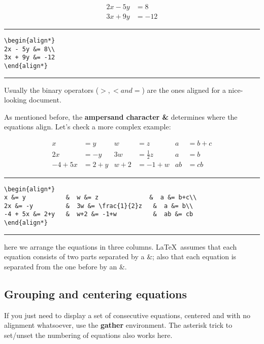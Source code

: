 \begin{align*}
2x - 5y &= 8\\
3x + 9y &= -12
\end{align*}

\noindent\vspace{1em}\hrule
\begin{verbatim}
\begin{align*}
2x - 5y &= 8\\
3x + 9y &= -12
\end{align*}
\end{verbatim}
\noindent\hrule\vspace{1em}

Usually the binary operators ($>,< and =$) are the ones aligned for a nice-looking document.

As mentioned before, the \textbf{ampersand character \&} determines where the equations align. Let's check a more complex example:

\begin{align*}
x &= y           &  w &= z              &  a &= b+c\\
2x &= -y         &  3w &= \frac{1}{2}z   &  a &= b\\
-4 + 5x &= 2+y   &  w+2 &= -1+w          &  ab &= cb
\end{align*}

\noindent\vspace{1em}\hrule
\begin{verbatim}
\begin{align*}
x &= y           &  w &= z              &  a &= b+c\\
2x &= -y         &  3w &= \frac{1}{2}z   &  a &= b\\
-4 + 5x &= 2+y   &  w+2 &= -1+w          &  ab &= cb
\end{align*}
\end{verbatim}
\noindent\hrule\vspace{1em}

here we arrange the equations in three columns. \LaTeX~assumes that each equation consists of two parts separated by a \&; also that each equation is separated from the one before by an \&.

\subsection{Grouping and centering equations}
If you just need to display a set of consecutive equations, centered and with no alignment whatsoever, use the \textbf{gather} environment. The asterisk trick to set/unset the numbering of equations also works here.

